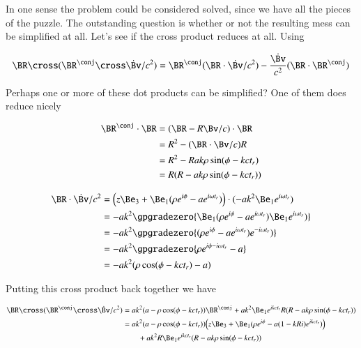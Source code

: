 In one sense the problem could be considered solved, since we have all the pieces of the puzzle.  The outstanding question is whether or not the resulting mess can be simplified at all.  Let's see if the cross product reduces at all.  Using

\begin{equation}\label{eqn:relativisticElectrodynamicsExamReflection:620}
\BR \cross (\BR^\conj \cross \dot{\Bv}/c^2) 
=
\BR^\conj (\BR \cdot \dot{\Bv}/c^2) 
- \frac{\dot{\Bv}}{c^2}
(\BR \cdot \BR^\conj)
\end{equation}

Perhaps one or more of these dot products can be simplified?  One of them does reduce nicely

\begin{align*}
\BR^\conj \cdot \BR 
&= ( \BR - R \Bv/c ) \cdot \BR  \\
&= R^2 - (\BR \cdot \Bv/c) R \\
&= R^2 - R a k \rho \sin(\phi - k c t_r) \\
&= R(R - a k \rho \sin(\phi - k c t_r))
\end{align*}

\begin{align*}
\BR \cdot \dot{\Bv}/c^2
&=
\Bigl(z \Be_3 + \Be_1 (\rho e^{i \phi} - a e^{i \omega t_r} ) \Bigr) \cdot
(-a k^2 \Be_1 e^{i \omega t_r} )  \\
&=
- a k^2 \gpgradezero{
\Be_1 (\rho e^{i \phi} - a e^{i \omega t_r} ) 
\Be_1 e^{i \omega t_r} )  
} \\
&=
- a k^2 \gpgradezero{
(\rho e^{i \phi} - a e^{i \omega t_r} ) 
e^{-i \omega t_r} )  
} \\
&=
- a k^2 \gpgradezero{
\rho e^{i \phi - i \omega t_r} - a 
} \\
&=
- a k^2 ( \rho \cos(\phi - k c t_r) - a )
\end{align*}

Putting this cross product back together we have

\begin{align*}
\BR \cross (\BR^\conj \cross \dot{\Bv}/c^2)
&=
a k^2 ( a -\rho \cos(\phi - k c t_r) ) \BR^\conj 
+a k^2 \Be_1 e^{i k c  t_r} R(R - a k \rho \sin(\phi - k c t_r)) \\
&=
a k^2 ( a -\rho \cos(\phi - k c t_r) ) \Bigl(
z \Be_3 + \Be_1 (\rho e^{i \phi} - a (1 - k R i) e^{i k c t_r} )
\Bigr) \\
&\qquad +a k^2 R \Be_1 e^{i k c  t_r} (R - a k \rho \sin(\phi - k c t_r)) 
\end{align*}

